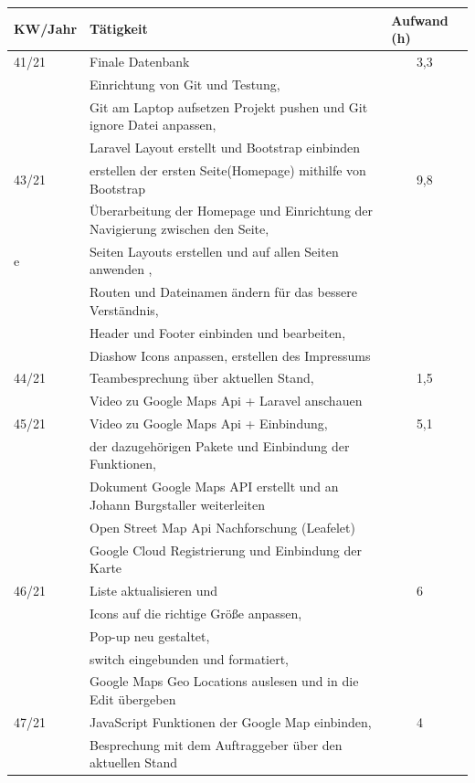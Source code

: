 \begin{table}[h]
	\begin{tabular}{|l|lll|}
		\hline
		KW/Jahr &
		\multicolumn{1}{l|}{Tätigkeit} &
		\multicolumn{2}{l|}{Aufwand (h)} \\ \hline
		41/21 &
		\multicolumn{2}{l|}{Finale Datenbank} &
		3,3 \\ &Einrichtung von Git und Testung,\\&Git am Laptop aufsetzen Projekt pushen und Git ignore Datei anpassen,\\&Laravel Layout erstellt und Bootstrap einbinden\\\hline
		43/21 &
		\multicolumn{2}{l|}{erstellen der ersten Seite(Homepage) mithilfe von Bootstrap} &
		9,8 \\ &Überarbeitung der Homepage und Einrichtung der Navigierung zwischen den Seite, \\e&Seiten Layouts erstellen und auf allen Seiten anwenden ,\\&Routen und Dateinamen ändern für das bessere Verständnis,\\& Header  und Footer  einbinden und bearbeiten,\\&Diashow Icons anpassen, erstellen des Impressums\\\hline
		44/21 &
		\multicolumn{2}{l|}{Teambesprechung über aktuellen Stand, } &
		1,5 \\&Video zu Google Maps Api + Laravel anschauen\\ \hline
		45/21 &
		\multicolumn{2}{l|}{Video zu Google Maps Api + Einbindung, } &
		5,1 \\ &der dazugehörigen Pakete und Einbindung der Funktionen,\\&  Dokument Google Maps API erstellt und an Johann Burgstaller weiterleiten\\&Open Street Map Api Nachforschung (Leafelet)\\&Google Cloud Registrierung und Einbindung der Karte\\\hline
		46/21 &
		\multicolumn{2}{l|}{Liste aktualisieren und    } &
		6 \\ &Icons auf die richtige Größe anpassen,\\&Pop-up neu gestaltet,\\&switch eingebunden und formatiert,\\&Google Maps Geo Locations auslesen und in die Edit übergeben\\\hline
		47/21 &
		\multicolumn{2}{l|}{JavaScript Funktionen der Google Map einbinden, } &
		4 \\&Besprechung mit dem Auftraggeber über den aktuellen Stand\\ \hline

\end{tabular}
\end{table}
